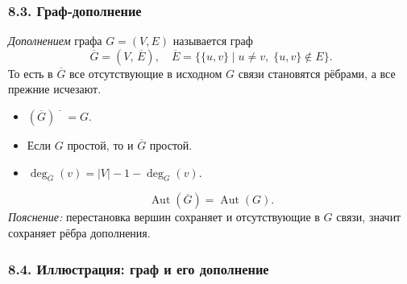 \subsubsection{8.3. Граф‑дополнение}

\emph{Дополнением} графа $G=(V,E)$ называется граф
\[
  \overline{G} = (V,\,\overline{E}),
  \quad \overline{E} = \bigl\{\{u,v\}\mid u\neq v,\;\{u,v\}\notin E\bigr\}.
\]
То есть в $\overline{G}$ все отсутствующие в исходном $G$ связи становятся рёбрами, а все прежние исчезают.

\begin{itemize}[leftmargin=*]
  \item $(\overline{G})\!\!\overline{\phantom{G}} = G$.
  \item Если $G$ простой, то и $\overline{G}$ простой.
  \item $\deg_{\overline G}(v) = |V|-1 - \deg_G(v)$.
\end{itemize}


\vspace{-0.3em}
\[
  \operatorname{Aut}(\overline{G}) = \operatorname{Aut}(G).
\]
\emph{Пояснение:} перестановка вершин сохраняет и отсутствующие в $G$ связи, значит сохраняет рёбра дополнения.

\subsubsection{8.4. Иллюстрация: граф и его дополнение}

\begin{center}
\end{center}

